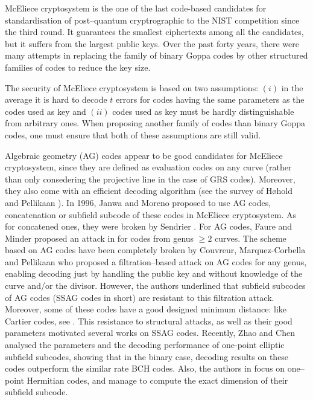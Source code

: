 \documentclass[a4paper]{article}
\theoremstyle{definition}
\theoremstyle{remark}
\begin{document}
McEliece cryptosystem is the one of the last code-based candidates for standardisation of post--quantum cryptrographic to the NIST competition since the third round. It guarantees the smallest ciphertexts among all the candidates, but it suffers from the largest public keys. Over the past forty years, there were many attempts in replacing the family of binary Goppa codes by other structured families of codes to reduce the key size.

The security of McEliece cryptosystem is based on two assumptions: $(i)$ in the average it is hard to decode $t$ errors for codes having the same parameters as the codes used as key and $(ii)$ codes used as key must be hardly distinguishable from arbitrary ones. When proposing another family of codes than binary Goppa codes, one must ensure that both of these assumptions are still valid.

Algebraic geometry (AG) codes appear to be good candidates for McEliece cryptosystem, since they are defined as evaluation codes on any curve (rather than only consedering the projective line in the case of GRS codes). Moreover, they also come with an efficient decoding algorithm (see the survey of Høhold and Pellikaan \cite{HP95}).
In 1996, Janwa and Moreno \cite{JM96} proposed to use AG codes, concatenation or subfield subcode of these codes in McEliece cryptosystem. As for concatened ones, they were broken by Sendrier \cite{Sen94}. For AG codes, Faure and Minder proposed an attack in \cite{FM08,Min07,Fau09} for codes from genus $\geq 2$ curves. The scheme based on AG codes have been completely broken by Couvreur, Marquez-Corbella and Pellikaan \cite{CMR17} who proposed a filtration--based attack on AG codes for any genus, enabling decoding just by handling the public key and without knowledge of the curve and/or the divisor. However, the authors underlined that subfield subcodes of AG codes (SSAG codes in short) are resistant to this filtration attack. Moreover, some of these codes have a good designed minimum distance: like Cartier codes, see \cite{Cou14}. This resistance to structural attacks, as well as their good parameters motivated several works on SSAG codes. Recently, Zhao and Chen \cite{ZC22} analysed the parameters and the decoding performance of one-point elliptic subfield subcodes, showing that in the binary case, decoding results on these codes outperform the similar rate BCH codes. Also, the authors in \cite{PJ14,EKN21} focus on one--point Hermitian codes, and manage to compute the exact dimension of their subfield subcode. 
\end{document}
